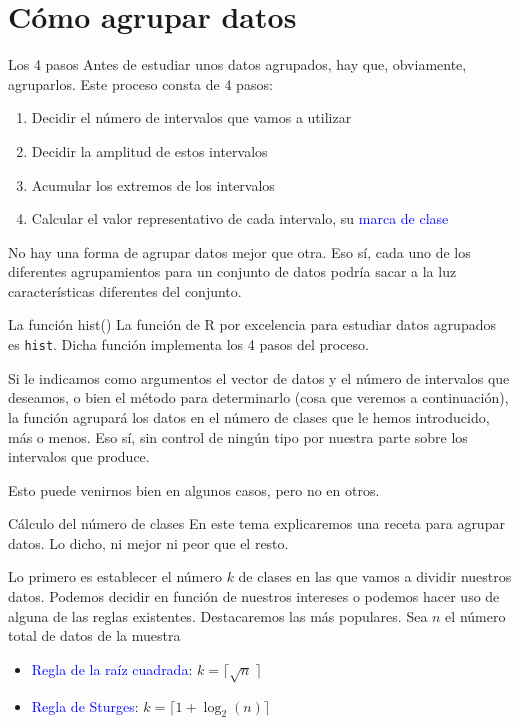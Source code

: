 \documentclass[
  ignorenonframetext,
]{beamer}
\providecommand{\tightlist}{%
  \setlength{\itemsep}{0pt}\setlength{\parskip}{0pt}}
\newcommand\blue[1]{\textcolor{blue}{#1}}
\begin{document}
\section{Cómo agrupar datos}\label{cuxf3mo-agrupar-datos}

\begin{frame}{Los 4 pasos}
\label{los-4-pasos}
Antes de estudiar unos datos agrupados, hay que, obviamente, agruparlos.
Este proceso consta de 4 pasos:

\begin{enumerate}
\tightlist
\item
  Decidir el número de intervalos que vamos a utilizar
\item
  Decidir la amplitud de estos intervalos
\item
  Acumular los extremos de los intervalos
\item
  Calcular el valor representativo de cada intervalo, su
  \blue{marca de clase}
\end{enumerate}

No hay una forma de agrupar datos mejor que otra. Eso sí, cada uno de
los diferentes agrupamientos para un conjunto de datos podría sacar a la
luz características diferentes del conjunto.
\end{frame}

\begin{frame}[fragile]{La función hist()}
\label{la-funciuxf3n-hist}
La función de R por excelencia para estudiar datos agrupados es
\texttt{hist}. Dicha función implementa los 4 pasos del proceso.

Si le indicamos como argumentos el vector de datos y el número de
intervalos que deseamos, o bien el método para determinarlo (cosa que
veremos a continuación), la función agrupará los datos en el número de
clases que le hemos introducido, más o menos. Eso sí, sin control de
ningún tipo por nuestra parte sobre los intervalos que produce.

Esto puede venirnos bien en algunos casos, pero no en otros.
\end{frame}

\begin{frame}{Cálculo del número de clases}
\label{cuxe1lculo-del-nuxfamero-de-clases}
En este tema explicaremos una receta para agrupar datos. Lo dicho, ni
mejor ni peor que el resto.

Lo primero es establecer el número \(k\) de clases en las que vamos a
dividir nuestros datos. Podemos decidir en función de nuestros intereses
o podemos hacer uso de alguna de las reglas existentes. Destacaremos las
más populares. Sea \(n\) el número total de datos de la muestra

\begin{itemize}
\tightlist
\item
  \blue{Regla de la raíz cuadrada}: \(k = \lceil\sqrt{n}\ \rceil\)
\item
  \blue{Regla de Sturges}: \(k = \lceil 1+\log_{2}(n)\rceil\)
\end{itemize}
\end{frame}
\end{document}
